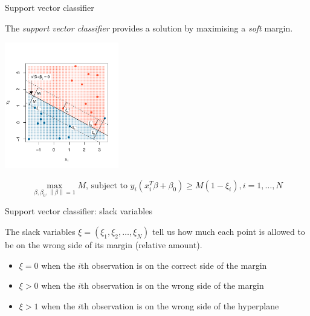 \documentclass[notes]{beamer}          %
\newcommand{\norm}[1]{\left\lVert#1\right\rVert}
\providecommand{\norm}[1]{\lVert#1\rVert}
\begin{document}
\begin{frame}{Support vector classifier}

The \textit{support vector classifier} provides a solution by maximising a \textit{soft} margin.
\begin{center}
\includegraphics[height=5.5cm]{figures/week_6/svm_support_vector_classifier.pdf}  
\end{center}

\vspace{-7mm} 

\begin{equation*}
\max_{\beta, \beta_0, \norm{\beta} = 1} M \text{, subject to } y_i(x^T_i \beta + \beta_0) \geq M (1-\xi_i), i=1, \dots, N
\end{equation*}

\end{frame}

\begin{frame}{Support vector classifier: slack variables}

The slack variables $\xi = (\xi_1, \xi_2, \dots, \xi_N)$ tell us how much each point is allowed to be on the wrong side of its margin (relative amount).

\begin{itemize}
    \item $\xi = 0$ when the $i$th observation is on the correct side of the margin
    \item $\xi > 0$ when the $i$th observation is on the wrong side of the margin
    \item $\xi > 1$ when the $i$th observation is on the wrong side of the hyperplane
\end{itemize}


\end{frame}
\end{document}
